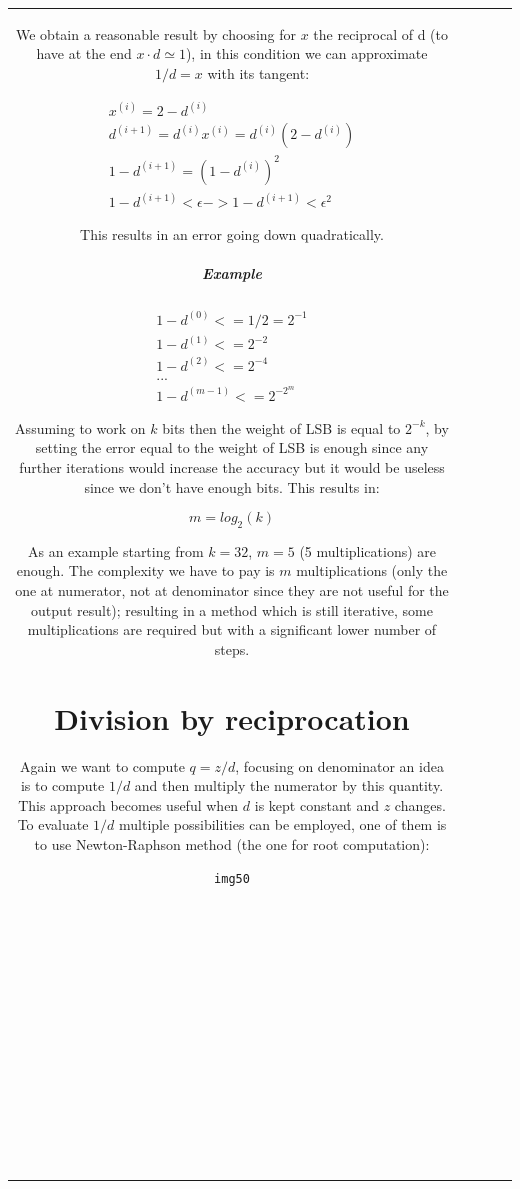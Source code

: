 \begin{center}
\begin{tabular}{|c|c|c|c|c|}
We obtain a reasonable result by choosing for $x$ the reciprocal of d (to have at the end $x \cdot d \simeq 1$), in this condition we can approximate $1/d=x$ with its tangent:

\begin{eqnarray}
x^{(i)}=2-d^{(i)}\\
d^{(i+1)}=d^{(i)} x^{(i)}=d^{(i)}(2-d^{(i)})\\
1-d^{(i+1)}=(1-d^{(i)})^2\\
1-d^{(i+1)} < \epsilon -> 1-d^{(i+1)} < \epsilon^2
\end{eqnarray}

This results in an error going down quadratically.

\subparagraph{Example}

\begin{eqnarray}
1-d^{(0)} <= 1/2 = 2^{-1}\\
1-d^{(1)} <= 2^{-2}\\
1-d^{(2)} <= 2^{-4}\\
...\\
1-d^{(m-1)} <= 2^{-2^m}
\end{eqnarray}

Assuming to work on $k$ bits then the weight of LSB is equal to $2^{-k}$, by setting the error equal to the weight of LSB is enough since any further iterations would increase the accuracy but it would be useless since we don't have enough bits. This results in:

$$m=log_2 (k)$$

As an example starting from $k=32$, $m=5$ (5 multiplications) are enough. The complexity we have to pay is $m$ multiplications (only the one at numerator, not at denominator since they are not useful for the output result); resulting in a method which is still iterative, some multiplications are required but with a significant lower number of steps.

\section{Division by reciprocation}

Again we want to compute $q=z/d$, focusing on denominator an idea is to compute $1/d$ and then multiply the numerator by this quantity. This approach becomes useful when $d$ is kept constant and $z$ changes. To evaluate $1/d$ multiple possibilities can be employed, one of them is to use Newton-Raphson method (the one for root computation):

\begin{verbatim}
img50















\end{verbatim}
\end{tabular}
\end{center}
